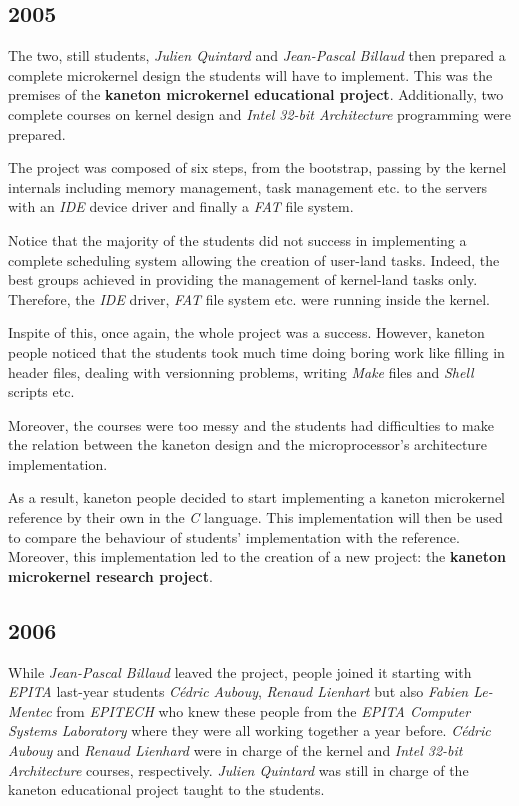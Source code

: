 \begin{multicols}{2}
%
%

\subsection{2005}

The two, still students, \textit{Julien Quintard} and \textit{Jean-Pascal
Billaud} then prepared a complete microkernel design the students will have
to implement. This was the premises of the \textbf{kaneton microkernel
educational project}. Additionally, two complete courses on kernel design and
\textit{Intel 32-bit Architecture} programming were prepared.

The project was composed of six steps, from the bootstrap, passing by
the kernel internals including memory management, task management etc.
to the servers with an \textit{IDE} device driver and finally a \textit{FAT}
file system.

Notice that the majority of the students did not success in implementing a
complete scheduling system allowing the creation of user-land tasks. Indeed,
the best groups achieved in providing the management of kernel-land tasks only.
Therefore, the \textit{IDE} driver, \textit{FAT} file system etc. were
running inside the kernel.

Inspite of this, once again, the whole project was a success. However,
kaneton people noticed that the students took much time doing boring work
like filling in header files, dealing with versionning problems, writing
\textit{Make} files and \textit{Shell} scripts etc.

Moreover, the courses were too messy and the students had difficulties
to make the relation between the kaneton design and the microprocessor's
architecture implementation.

As a result, kaneton people decided to start implementing a kaneton microkernel
reference by their own in the \textit{C} language. This implementation will
then be used to compare the behaviour of students' implementation with
the reference. Moreover, this implementation led to the creation of a
new project: the \textbf{kaneton microkernel research project}.

%
%

\subsection{2006}

While \textit{Jean-Pascal Billaud} leaved the project, people joined it
starting with \textit{EPITA} last-year students \textit{C\'edric Aubouy},
\textit{Renaud Lienhart} but also \textit{Fabien Le-Mentec} from
\textit{EPITECH} who knew these people from the \textit{EPITA Computer Systems
Laboratory} where they were all working together a year before.
\textit{C\'edric Aubouy} and \textit{Renaud Lienhard} were in charge of the
kernel and \textit{Intel 32-bit Architecture} courses, respectively.
\textit{Julien Quintard} was still in charge of the kaneton educational
project taught to the students.


\end{multicols}
